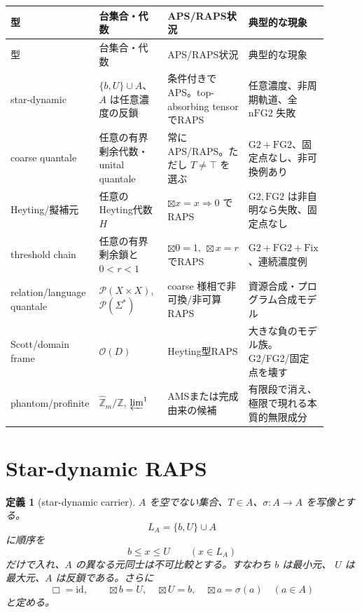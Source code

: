 \documentclass[uplatex,dvipdfmx,a4paper,10pt]{jsarticle}
\newtheorem{definition}[theorem]{定義}
\newcommand{\Gtwo}{\mathrm{G2}}
\newcommand{\FGtwo}{\mathrm{FG2}}
\newcommand{\nFGtwo}{\mathrm{nFG2}}
\newcommand{\Fix}{\mathrm{Fix}}
\newcommand{\bt}{\boxtimes}
\newcommand{\Pow}{\mathcal P}
\newcommand{\Top}{\top}
\begin{document}
\begin{longtable}{>{\raggedright\arraybackslash}p{0.19\linewidth}
                  >{\raggedright\arraybackslash}p{0.25\linewidth}
                  >{\raggedright\arraybackslash}p{0.25\linewidth}
                  >{\raggedright\arraybackslash}p{0.21\linewidth}}
\toprule
型 & 台集合・代数 & APS/RAPS状況 & 典型的な現象 \\
\midrule
\endfirsthead
\toprule
型 & 台集合・代数 & APS/RAPS状況 & 典型的な現象 \\
\midrule
\endhead
star-dynamic &
\(\{b,U\}\cup A\)、\(A\) は任意濃度の反鎖 &
条件付きでAPS。top-absorbing tensorでRAPS &
任意濃度、非周期軌道、全 \(\nFGtwo\) 失敗 \\
\midrule
coarse quantale &
任意の有界剰余代数・unital quantale &
常にAPS/RAPS。ただし \(T\ne\Top\) を選ぶ &
\(\Gtwo+\FGtwo\)、固定点なし、非可換例あり \\
\midrule
Heyting/擬補元 &
任意のHeyting代数 \(H\) &
\(\bt x=x\Rightarrow0\) でRAPS &
\(\Gtwo,\FGtwo\) は非自明なら失敗、固定点なし \\
\midrule
threshold chain &
任意の有界剰余鎖と \(0<r<1\) &
\(\bt0=1,\ \bt x=r\) でRAPS &
\(\Gtwo+\FGtwo+\Fix\)、連続濃度例 \\
\midrule
relation/language quantale &
\(\Pow(X\times X)\), \(\Pow(\Sigma^\ast)\) &
coarse 様相で非可換/非可算RAPS &
資源合成・プログラム合成モデル \\
\midrule
Scott/domain frame &
\(\mathcal O(D)\) &
Heyting型RAPS &
大きな負のモデル族。G2/FG2/固定点を壊す \\
\midrule
phantom/profinite &
\(\widehat{\mathbb Z}_m/\mathbb Z\), \(\varprojlim^1\) &
AMSまたは完成由来の候補 &
有限段で消え、極限で現れる本質的無限成分 \\
\bottomrule
\end{longtable}

\section{Star-dynamic RAPS}

\begin{definition}[star-dynamic carrier]
\(A\) を空でない集合、\(T\in A\)、\(\sigma:A\to A\) を写像とする。
\[
L_A=\{b,U\}\cup A
\]
に順序を
\[
b\le x\le U\qquad(x\in L_A)
\]
だけで入れ、\(A\) の異なる元同士は不可比較とする。すなわち \(b\) は最小元、
\(U\) は最大元、\(A\) は反鎖である。さらに
\[
\Box=\mathrm{id},\qquad
\bt b=U,\quad \bt U=b,\quad \bt a=\sigma(a)\quad(a\in A)
\]
と定める。
\end{definition}
\end{document}
